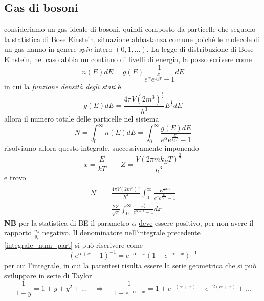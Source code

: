 \subsection{Gas di bosoni} consideriamo un gas ideale di bosoni, quindi composto da particelle che seguono la statistica di Bose Einstein, situazione abbastanza comune poiché le molecole di un gas hanno in genere \textit{spin} intero $(0, 1, ...)$.
La legge di distribuzione di Bose Einstein, nel caso abbia un continuo di livelli di energia, la posso scrivere come
\begin{equation}
n(E)dE = g(E) \frac{1}{e^{ \alpha } e^{ \frac{E}{k_B T} } - 1 } dE
\end{equation}
in cui la \textit{funzione densità degli stati} è
\begin{equation}
g(E)dE = \frac{4\pi V (2m^3)^{ \frac{1}{2} }}{h^3} E^{\frac{1}{2} } dE
\label{dens_stati}
\end{equation}
allora il numero totale delle particelle nel sistema
\begin{equation}
N = \int_0^{\infty} n(E)dE =  \int_0^{\infty} \frac{g(E) dE}{e^{\alpha} e^{ \frac{E}{k_B T} } - 1} 
\end{equation}
risolviamo allora questo integrale, successivamente imponendo
\begin{equation}
x = \frac{E}{kT} \quad\quad Z = \frac{V (2 \pi m k_B T)^{ \frac{3}{2} } }{h^3}
\end{equation}
e trovo
\begin{equation}
\begin{split}
N & = \frac{4\pi V (2m^3)^{ \frac{1}{2} }}{h^3} \int_0^{\infty} \frac{E^{ \frac{1}{2} dE }}{e^{\alpha} e^{ \frac{E}{k_B T} } - 1}  \\
&= \frac{2Z}{\sqrt{\pi}} \int_0^{\infty} \frac{x^{ \frac{1}{2} }}{e^{ \alpha + x } - 1} dx
\label{integrale_num_part}
\end{split}
\end{equation}
\textbf{NB} per la statistica di BE il parametro $\alpha$ \underline{deve} essere positivo, per non avere il rapporto $\frac{n_s}{g_s}$ negativo.
Il denominatore nell'integrale precedente \ref{integrale_num_part} si può riscrivere come
\begin{equation}
(e^{ \alpha + x } - 1)^{-1} = e^{ - \alpha - x } (1 - e^{ - \alpha - x })^{ -1 }
\end{equation}
per cui l'integrale, in cui la parentesi risulta essere la serie geometrica che si può sviluppare in serie di Taylor
$$ \frac{1}{1-y} = 1 + y + y^2 + ... \quad\Rightarrow\quad \frac{1}{1 - e^{ -\alpha - x }} = 1 + e^{ - ( \alpha + x) } + e^{ - 2 ( \alpha + x) } + ... $$
